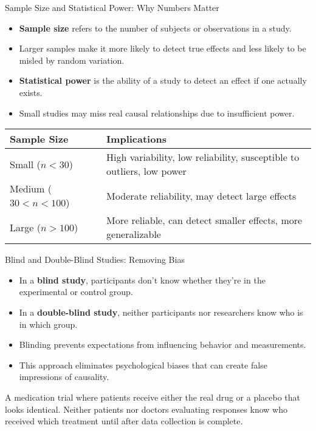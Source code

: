 \documentclass{beamer}
\begin{document}
\begin{frame}{Sample Size and Statistical Power: Why Numbers Matter}
    \begin{itemize}
        \item \textbf{Sample size} refers to the number of subjects or observations in a study.
        \item Larger samples make it more likely to detect true effects and less likely to be misled by random variation.
        \item \textbf{Statistical power} is the ability of a study to detect an effect if one actually exists.
        \item Small studies may miss real causal relationships due to insufficient power.
    \end{itemize}
    
    \begin{table}
        \centering
        \begin{tabular}{|l|p{7cm}|}
            \hline
            \textbf{Sample Size} & \textbf{Implications} \\
            \hline
            Small ($n < 30$) & High variability, low reliability, susceptible to outliers, low power \\
            \hline
            Medium ($30 < n < 100$) & Moderate reliability, may detect large effects \\
            \hline
            Large ($n > 100$) & More reliable, can detect smaller effects, more generalizable \\
            \hline
        \end{tabular}
    \end{table}
\end{frame}

\begin{frame}{Blind and Double-Blind Studies: Removing Bias}
    \begin{itemize}
        \item In a \textbf{blind study}, participants don't know whether they're in the experimental or control group.
        \item In a \textbf{double-blind study}, neither participants nor researchers know who is in which group.
        \item Blinding prevents expectations from influencing behavior and measurements.
        \item This approach eliminates psychological biases that can create false impressions of causality.
    \end{itemize}
    
    \begin{example}
        A medication trial where patients receive either the real drug or a placebo that looks identical. Neither patients nor doctors evaluating responses know who received which treatment until after data collection is complete.
    \end{example}
\end{frame}
\end{document}

